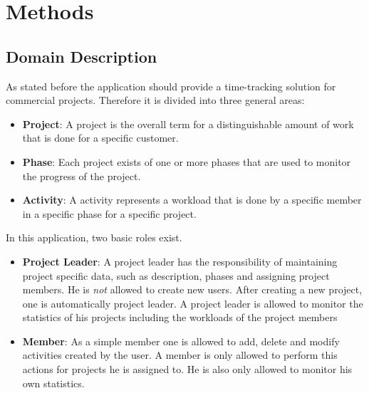 \chapter{Methods}

\section{Domain Description}
As stated before the application should provide a time-tracking solution for commercial projects.
Therefore it is divided into three general areas:
\begin{itemize}
\item \textbf{Project}: A project is the overall term for a distinguishable amount of work that is done for a specific customer.
\item \textbf{Phase}: Each project exists of one or more phases that are used to monitor the progress of the project.
\item \textbf{Activity}: A activity represents a workload that is done by a specific member in a specific phase for a specific project.
\end{itemize}
In this application, two basic roles exist.
\begin{itemize}
\item \textbf{Project Leader}: A project leader has the responsibility of maintaining project specific data, such as description, phases and assigning project members. He is \emph{not} allowed to create new users. After creating a new project, one is automatically project leader. A project leader is allowed to monitor the statistics of his projects including the workloads of the project members
\item \textbf{Member}: As a simple member one is allowed to add, delete and modify activities created by the user. A member is only allowed to perform this actions for projects he is assigned to. He is also only allowed to monitor his own statistics.
\end{itemize}
